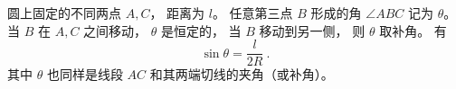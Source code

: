 
\begin{issues}
\issueDraft
\end{issues}

圆上固定的不同两点 $A,C$， 距离为 $l$。 任意第三点 $B$ 形成的角 $\angle ABC$ 记为 $\theta$。 当 $B$ 在 $A,C$ 之间移动， $\theta$ 是恒定的， 当 $B$ 移动到另一侧， 则 $\theta$ 取补角。 有
\begin{equation}\label{eq_SphTri_1}
\sin\theta = \frac{l}{2R}~.
\end{equation}
其中 $\theta$ 也同样是线段 $AC$ 和其两端切线的夹角（或补角）。
